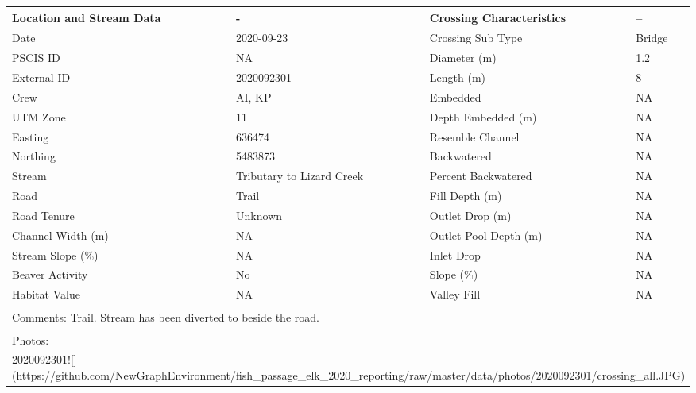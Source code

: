 \documentclass[
]{book}
\begin{document}
\begin{tabular}{l|l|l|l}
\hline
Location and Stream Data & - & Crossing Characteristics & --\\
\hline
Date & 2020-09-23 & Crossing Sub Type & Bridge\\
\hline
PSCIS ID & NA & Diameter (m) & 1.2\\
\hline
External ID & 2020092301 & Length (m) & 8\\
\hline
Crew & AI, KP & Embedded & NA\\
\hline
UTM Zone & 11 & Depth Embedded (m) & NA\\
\hline
Easting & 636474 & Resemble Channel & NA\\
\hline
Northing & 5483873 & Backwatered & NA\\
\hline
Stream & Tributary to Lizard Creek & Percent Backwatered & NA\\
\hline
Road & Trail & Fill Depth (m) & NA\\
\hline
Road Tenure & Unknown & Outlet Drop (m) & NA\\
\hline
Channel Width (m) & NA & Outlet Pool Depth (m) & NA\\
\hline
Stream Slope (\%) & NA & Inlet Drop & NA\\
\hline
Beaver Activity & No & Slope (\%) & NA\\
\hline
Habitat Value & NA & Valley Fill & NA\\
\hline
\multicolumn{4}{l}{\textsuperscript{} Comments: Trail. Stream has been diverted to beside the road.}\\
\multicolumn{4}{l}{\textsuperscript{} Photos:}\\
\multicolumn{4}{l}{2020092301![](https://github.com/NewGraphEnvironment/fish\_passage\_elk\_2020\_reporting/raw/master/data/photos/2020092301/crossing\_all.JPG)}\\
\end{tabular}
\end{document}

